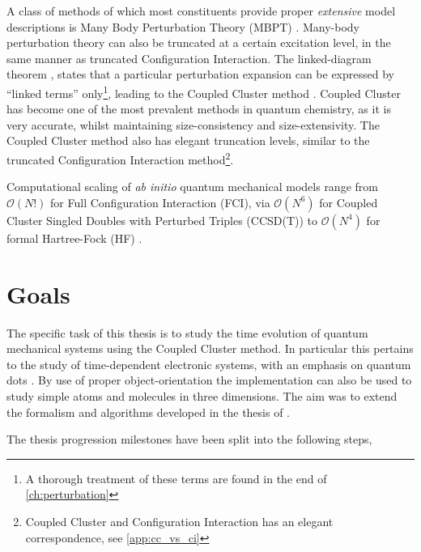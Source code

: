     A class of methods of which most constituents provide proper \emph{extensive} model
    descriptions is Many Body Perturbation Theory (MBPT) \cite{brueckner1955approximate}.
    Many-body perturbation theory can also be truncated at a certain 
    excitation level, in the same manner as truncated Configuration Interaction. 
    The linked-diagram theorem \cite{goldstone1957derivation}, states that a 
    particular perturbation expansion can be expressed by ``linked terms''
    only\footnote{A thorough treatment of these terms are found in the end of
    \autoref{ch:perturbation}},
    leading to the Coupled Cluster method \cite{coester1958bound,coester1960short}.
    Coupled Cluster has become one of the most prevalent methods in quantum chemistry,
    as it is very accurate, whilst maintaining size-consistency and size-extensivity.
    The Coupled Cluster method also has elegant truncation levels, similar to the 
    truncated Configuration Interaction method\footnote{Coupled Cluster and
    Configuration Interaction has an elegant correspondence,
    see \autoref{app:cc_vs_ci}}.

    Computational scaling of \emph{ab initio} quantum mechanical models range from 
    $\mathcal{O}(N!)$ for Full Configuration Interaction (FCI), via $\mathcal{O}(N^6)$ 
    for Coupled Cluster Singled Doubles with Perturbed Triples (CCSD(T)) to 
    $\mathcal{O}(N^4)$ for formal Hartree-Fock (HF) \cite{ratcliff2017challenges}.


\section{Goals}

    The specific task of this thesis is to study the time evolution of quantum 
    mechanical systems using the Coupled Cluster method. In particular this 
    pertains to the study of time-dependent electronic systems, with an emphasis 
    on quantum dots \cite{ashoori1996electrons}.
    By use of proper object-orientation the implementation can 
    also be used to study simple atoms and molecules in three dimensions.
    The aim was to 
    extend the formalism and algorithms developed in the thesis of 
    \citeauthor{haakon2017time} \cite{haakon2017time}.

    The thesis progression milestones have been split into the following steps,


